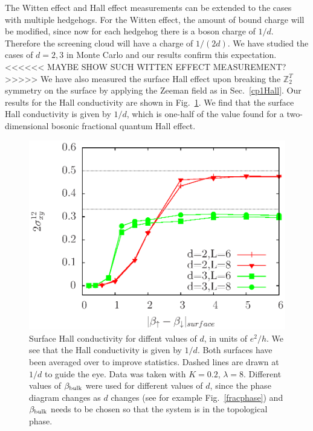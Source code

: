 \documentclass[prb,twocolumn]{revtex4-1}
\def\ztwot{\mathbb{Z}_2^T}
\begin{document}
The Witten effect and Hall effect measurements can be extended to the cases with multiple hedgehogs. For the Witten effect, the amount of bound charge will be modified, since now for each hedgehog there is a boson charge of $1/d$. Therefore the screening cloud will have a charge of $1/(2d)$. We have studied the cases of $d=2, 3$ in Monte Carlo and our results confirm this expectation. 
<<<<<< MAYBE SHOW SUCH WITTEN EFFECT MEASUREMENT? >>>>>
We have also measured the surface Hall effect upon breaking the $\ztwot$ symmetry on the surface by applying the Zeeman field as in Sec.~\ref{cp1Hall}.
Our results for the Hall conductivity are shown in Fig.~\ref{halldiff}. We find that the surface Hall conductivity is given by $1/d$, which is one-half of the value found for a two-dimensional bosonic fractional quantum Hall effect.


\begin{figure}
\includegraphics[width=\linewidth]{figures/halldiff.eps}
\caption{Surface Hall conductivity for diffent values of $d$, in units of $e^2/h$. We see that the Hall conductivity is given by $1/d$. Both surfaces have been averaged over to improve statistics. Dashed lines are drawn at $1/d$ to guide the eye. Data was taken with $K=0.2$, $\lambda=8$. Different values of $\beta_{\rm bulk}$ were used for different values of $d$, since the phase diagram changes as $d$ changes (see for example Fig.~\ref{fracphase}) and $\beta_{\rm bulk}$ needs to be chosen so that the system is in the topological phase.
}
\label{halldiff}
\end{figure}
\end{document}

